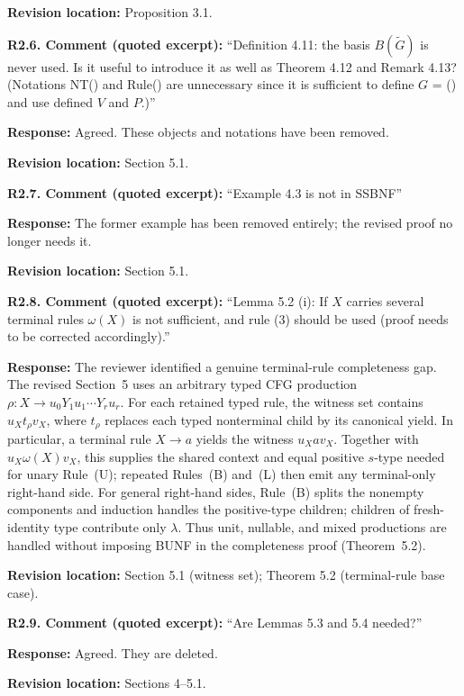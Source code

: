 \documentclass[
  10pt,
  a4paper,
]{article}
\begin{document}
\textbf{Revision location:} Proposition 3.1.


\textbf{R2.6. Comment (quoted excerpt):} ``Definition 4.11: the basis
\(B(\widetilde G)\) is never used. Is it useful to introduce it as well
as Theorem 4.12 and Remark 4.13? (Notations NT() and Rule() are
unnecessary since it is sufficient to define \(G\) = () and use defined
\(V\) and \(P\).)''

\textbf{Response:} Agreed. These objects and notations have been
removed.

\textbf{Revision location:} Section 5.1.


\textbf{R2.7. Comment (quoted excerpt):} ``Example 4.3 is not in SSBNF''

\textbf{Response:} The former example has been removed entirely; the
revised proof no longer needs it.

\textbf{Revision location:} Section 5.1.


\textbf{R2.8. Comment (quoted excerpt):} ``Lemma 5.2 (i): If \(X\) carries
several terminal rules \(\omega(X)\) is not sufficient, and rule (3)
should be used (proof needs to be corrected accordingly).''

\textbf{Response:} The reviewer identified a genuine terminal-rule
completeness gap.  The revised Section~5 uses an arbitrary
typed CFG production $\rho:X\to u_0Y_1u_1\cdots Y_ru_r$.
For each retained typed rule, the witness set contains
$u_Xt_\rho v_X$, where $t_\rho$ replaces each typed
nonterminal child by its canonical yield.  In particular,
a terminal rule $X\to a$ yields the witness $u_Xav_X$.
Together with $u_X\omega(X)v_X$, this supplies the
shared context and equal positive $s$-type needed for
unary Rule~\textup{(U)}; repeated Rules~\textup{(B)}
and~\textup{(L)} then emit any terminal-only right-hand
side.  For general right-hand sides, Rule~\textup{(B)}
splits the nonempty components and induction handles
the positive-type children; children of fresh-identity
type contribute only $\lambda$.  Thus unit, nullable,
and mixed productions are handled without imposing
BUNF in the completeness proof (Theorem~5.2).

\textbf{Revision location:} Section 5.1 (witness set); Theorem 5.2
(terminal-rule base case).


\textbf{R2.9. Comment (quoted excerpt):} ``Are Lemmas 5.3 and 5.4 needed?''

\textbf{Response:} Agreed. They are deleted.

\textbf{Revision location:} Sections 4--5.1.
\end{document}
